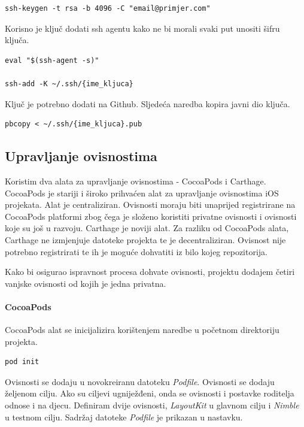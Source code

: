 \documentclass[times, utf8, diplomski, numeric]{fer}
\begin{document}
\begin{appendices}
\begin{verbatim}
ssh-keygen -t rsa -b 4096 -C "email@primjer.com"
\end{verbatim}

Korisno je ključ dodati ssh agentu kako ne bi morali svaki put unositi šifru ključa.

\begin{verbatim}
eval "$(ssh-agent -s)"

ssh-add -K ~/.ssh/{ime_kljuca}
\end{verbatim}

Ključ je potrebno dodati na Github. Sljedeća naredba kopira javni dio ključa.

\begin{verbatim}
pbcopy < ~/.ssh/{ime_kljuca}.pub
\end{verbatim}


\subsection{Upravljanje ovisnostima}

Koristim dva alata za upravljanje ovisnostima - CocoaPods i Carthage. CocoaPods je stariji i široko prihvaćen alat za upravljanje ovisnostima iOS projekata. Alat je centraliziran. Ovisnosti moraju biti unaprijed registrirane na CocoaPods platformi zbog čega je složeno koristiti privatne ovisnosti i ovisnosti koje su još u razvoju. Carthage je noviji alat. Za razliku od CocoaPods alata, Carthage ne izmjenjuje datoteke projekta te je decentraliziran. Ovisnost nije potrebno registrirati te ih je moguće dohvatiti iz bilo kojeg repozitorija.

Kako bi osigurao ispravnost procesa dohvate ovisnosti, projektu dodajem četiri vanjske ovisnosti od kojih je jedna privatna.

\paragraph{CocoaPods}

CocoaPods alat se inicijalizira korištenjem naredbe u početnom direktoriju projekta.

\begin{verbatim}
pod init
\end{verbatim}

Ovisnosti se dodaju u novokreiranu datoteku \textit{Podfile}. Ovisnosti se dodaju željenom cilju. Ako su ciljevi ugniježđeni, onda se ovisnosti i postavke roditelja odnose i na djecu. Definiram dvije ovisnosti, \textit{LayoutKit} u glavnom cilju i \textit{Nimble} u testnom cilju. Sadržaj datoteke \textit{Podfile} je prikazan u nastavku.


\end{appendices}
\end{document}
